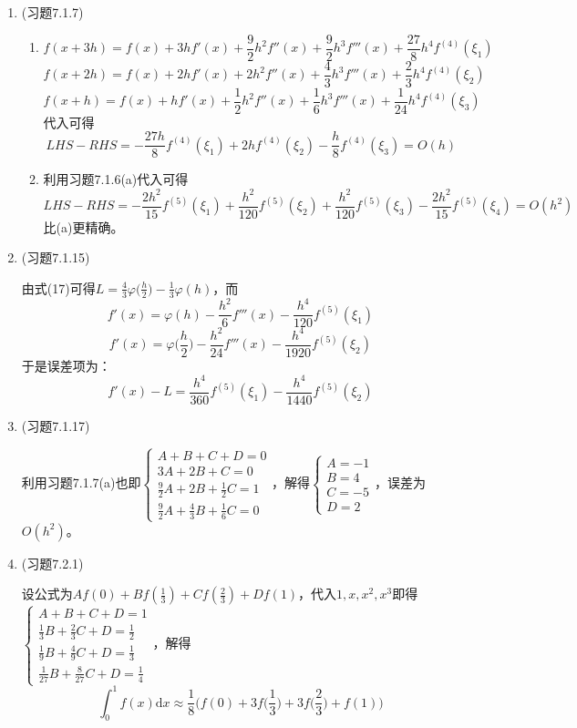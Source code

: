 \documentclass[a4paper,UTF8,fontset=windows]{ctexart}
\begin{document}
\begin{enumerate}
    \item (习题7.1.7)
    \begin{enumerate}
        \item 
        $$f(x+3h)=f(x)+3hf'(x)+\frac{9}{2}h^2f''(x)+\frac{9}{2}h^3f'''(x)+\frac{27}{8}h^4f^{(4)}(\xi_1)$$
        $$f(x+2h)=f(x)+2hf'(x)+2h^2f''(x)+\frac{4}{3}h^3f'''(x)+\frac{2}{3}h^4f^{(4)}(\xi_2)$$
        $$f(x+h)=f(x)+hf'(x)+\frac{1}{2}h^2f''(x)+\frac{1}{6}h^3f'''(x)+\frac{1}{24}h^4f^{(4)}(\xi_3)$$
        代入可得
        $$LHS-RHS=-\frac{27h}{8}f^{(4)}(\xi_1)+2hf^{(4)}(\xi_2)-\frac{h}{8}f^{(4)}(\xi_3)=O(h)$$
    
        \item
        利用习题7.1.6(a)代入可得
        $$LHS-RHS=-\frac{2h^2}{15}f^{(5)}(\xi_1)+\frac{h^2}{120}f^{(5)}(\xi_2)+\frac{h^2}{120}f^{(5)}(\xi_3)-\frac{2h^2}{15}f^{(5)}(\xi_4)=O(h^2)$$
        比(a)更精确。
    \end{enumerate}
    
    
    \item (习题7.1.15)
    
    由式(17)可得$L=\frac{4}{3}\varphi\big(\frac{h}{2}\big)-\frac{1}{3}\varphi(h)$，而
    $$f'(x)=\varphi(h)-\frac{h^2}{6}f'''(x)-\frac{h^4}{120}f^{(5)}(\xi_1)$$
    $$f'(x)=\varphi\big(\frac{h}{2}\big)-\frac{h^2}{24}f'''(x)-\frac{h^4}{1920}f^{(5)}(\xi_2)$$
    于是误差项为：
    $$f'(x)-L=\frac{h^4}{360}f^{(5)}(\xi_1)-\frac{h^4}{1440}f^{(5)}(\xi_2)$$
    
    \item (习题7.1.17)
    
    利用习题7.1.7(a)也即$\begin{cases}A+B+C+D=0\\3A+2B+C=0\\\frac{9}{2}A+2B+\frac{1}{2}C=1\\\frac{9}{2}A+\frac{4}{3}B+\frac{1}{6}C=0\end{cases}$，解得$\begin{cases}A=-1\\B=4\\C=-5\\D=2\end{cases}$，误差为$O(h^2)$。
    
    \item (习题7.2.1)
    
    设公式为$Af(0)+Bf(\frac{1}{3})+Cf(\frac{2}{3})+Df(1)$，代入$1,x,x^2,x^3$即得$\begin{cases}A+B+C+D=1\\\frac{1}{3}B+\frac{2}{3}C+D=\frac{1}{2}\\\frac{1}{9}B+\frac{4}{9}C+D=\frac{1}{3}\\\frac{1}{27}B+\frac{8}{27}C+D=\frac{1}{4}\end{cases}$，解得
    $$\int_0^1f(x)\mathrm{d}x\approx \frac{1}{8}\bigg(f(0)+3f\big(\frac{1}{3}\big)+3f\big(\frac{2}{3}\big)+f(1)\bigg)$$
    

\end{enumerate}
\end{document}
